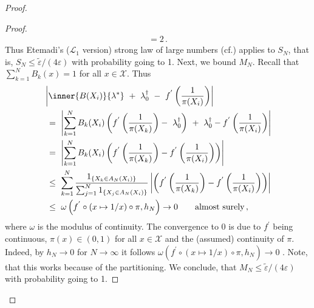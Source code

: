 \begin{proof}
\begin{proof}
\begin{gather}
  =
  2
  \,.
\end{gather}
Thus Etemadi's ($\mathcal{L}_1$ version) strong law of large numbers (cf.\cite[Theorem~5.17]{Klenke2020}) applies
to $S_N$, that is,
$S_N \le 
\tilde{\varepsilon}
/
(4\varepsilon)
$
with probability going to 1.
Next, we bound $M_N$.
Recall that $\sum_{k=1}^{N}B_k(x)=1$ for all $x\in\mathcal{X}$. Thus
\begin{align*}
  &
\left| 
        \inner
       {B(X_i)}
       {\lambda^*}
      \ 
       +
      \ 
      \lambda^\dagger_0
      \ 
        -
        \ 
        f^{'}
        \left( 
          \frac{1}{\pi(X_i)}
     \right)
\right|
      \\
      &
      \ 
      =
      \ 
      \left| 
      \sum_{k=1}^{N} 
      B_k(X_i)
      \left( 
        f^{'}
        \left( 
          \frac{1}{\pi(X_k)}
     \right)
  -
  \ 
  \lambda_0^\dagger
      \right)
      \ 
      +
      \ 
      \lambda_0^\dagger
      -
        f^{'}
        \left( 
          \frac{1}{\pi(X_i)}
     \right)
      \right|
      \\
      &
      \ 
      =
      \ 
      \left| 
      \sum_{k=1}^{N} 
      B_k(X_i)
      \left( 
        f^{'}
        \left( 
          \frac{1}{\pi(X_k)}
     \right)
     -
        f^{'}
        \left( 
          \frac{1}{\pi(X_i)}
     \right)
      \right)
      \right|
      \\
      &
      \ 
      \le
      \ 
      \sum_{k=1}^{N} 
      \frac{1_{\left\{ X_k\in A_N(X_i) \right\}}}
      {
        \sum_{j=1}^{N} 
1_{\left\{ X_j\in A_N(X_i) \right\}}
      }
      \left| 
      \left( 
        f^{'}
        \left( 
          \frac{1}{\pi(X_k)}
     \right)
     -
        f^{'}
        \left( 
          \frac{1}{\pi(X_i)}
     \right)
      \right)
      \right|
      \\
      &
      \ 
      \le
      \ 
      \omega
      \left( f^{'}\circ (x\mapsto1/x)\circ \pi,h_N \right)
      \to
      0
      \qquad
      \text{almost surely}
      \,,
\end{align*}
where $\omega$ is the modulus of continuity.
The convergence to 0 is due to $f^{'}$ being continuous, $\pi(x)\in(0,1)$ for all $x\in\mathcal{X}$ and the (assumed) continuity of $\pi$.
Indeed, by $h_N\to 0$ for $N\to\infty$ it follows
$
      \omega
      \left( f^{'}\circ (x\mapsto1/x)\circ \pi,h_N \right)
      \to
      0
$
.
Note, that this works because of the partitioning.
We conclude, that $
M_N\le
\tilde{\varepsilon}
/
(4\varepsilon)
$
with probability going to 1.


\end{proof}
\end{proof}
